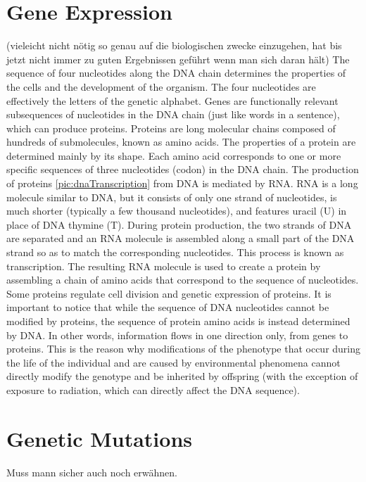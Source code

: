 \section{Gene Expression}
  (vieleicht nicht nötig so genau auf die biologischen zwecke einzugehen, hat bis jetzt nicht immer zu guten Ergebnissen geführt wenn man sich daran hält)
  The sequence of four nucleotides along the DNA chain determines the properties of the cells and the development of the organism. The four nucleotides are effectively the letters of the genetic alphabet.
  Genes are functionally relevant subsequences of nucleotides in the DNA chain (just like words in a sentence), which can produce proteins.
  Proteins are long molecular chains composed of hundreds of submolecules, known as amino acids.  The properties of a protein are determined mainly by its shape. Each amino acid corresponds to one or
  more specific sequences of three nucleotides (codon) in the DNA chain. The production of proteins \ref{pic:dnaTranscription} from DNA is mediated by RNA.
  RNA is a long molecule similar to DNA, but it consists of only one strand of nucleotides, is much shorter (typically a few thousand nucleotides), and features uracil (U) in place of DNA thymine (T).
  During protein production, the two strands of DNA are separated and an RNA molecule is assembled along a small part of the DNA strand so as to match the corresponding nucleotides.
  This process is known as transcription. The resulting RNA molecule is used to create a protein by assembling a chain of amino acids that correspond to the sequence of nucleotides.
  Some proteins regulate cell division and genetic expression of proteins. It is important to notice that while the sequence of DNA nucleotides cannot be modified by proteins, the sequence of protein amino
  acids is instead determined by DNA. In other words, information flows in one direction only, from genes to proteins. This is the reason why modifications of the phenotype that occur during the life of the individual and are
  caused by environmental phenomena cannot directly modify the genotype and be inherited by offspring (with the exception of exposure to radiation, which can directly affect the DNA sequence).

\section{Genetic Mutations}
  Muss mann sicher auch noch erwähnen.

